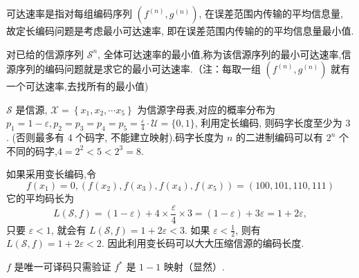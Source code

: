 可达速率是指对每组编码序列 $ \left(f^{(n)}, g^{(n)}\right) $, 在误差范围内传输的平均信息量, 故定长编码问题是考虑最小可达速率, 即在误差范围内传输的的平均信息量最小值.

\begin{definition}[信源序列的最小可达速率和它的编码问题]
    对已给的信源序列 $ \mathscr{S}^{n} $, 全体可达速率的最小值,称为该信源序列的最小可达速率,信源序列的编码问题就是求它的最小可达速率.（注：每取一组 $ \left(f^{(n)}, g^{(n)}\right) $ 就有一个可达速率,去找所有的最小值)
\end{definition}

\begin{example}
     $ \mathscr{S} $ 是信源, $ \mathscr{X}=\left\{x_{1}, x_{2}, \cdots x_{5}\right\} $ 为信源字母表,对应的概率分布为 $ p_{1}=1-\varepsilon, p_{2}=p_{3}=p_{4}=p_{5}=\frac{\varepsilon}{4} \cdot \mathscr{U}=\{0,1\} $, 利用定长编码, 则码字长度至少为 3 . (否则最多有 4 个码字, 不能建立映射).码字长度为 $ n $ 的二进制编码可以有 $ 2^{n} $ 个不同的码字,$ 4=2^2<5<2^{3}=8 $.

如果采用变长编码,令
$$
f\left(x_{1}\right)=0,\left(f\left(x_{2}\right), f\left(x_{3}\right), f\left(x_{4}\right), f\left(x_{5}\right)\right)=(100,101,110,111)
$$
它的平均码长为
$$
L(\mathscr{S}, f)=(1-\varepsilon)+4 \times \frac{\varepsilon}{4} \times 3=(1-\varepsilon)+3 \varepsilon=1+2 \varepsilon,
$$
只要 $ \varepsilon<1 $, 就会有 $ L(\mathscr{S}, f)=1+2 \varepsilon<3 $. 如果 $ \varepsilon<\frac{1}{2} $, 则有 $ L(\mathscr{S}, f)=1+2 \varepsilon<2 $. 因此利用变长码可以大大压缩信源的编码长度.

$ f $ 是唯一可译码只需验证 $ f^{*} $ 是 $ 1-1 $ 映射（显然）.
\end{example}


